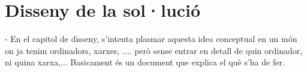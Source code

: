 \chapter{Disseny de la sol·lució}

        - En el capitol de disseny, s'intenta plasmar
        aquesta idea conceptual en un món on ja tenim
        ordinadors, xarxes, .... però sense entrar en
        detall de quin ordinador, ni quina xarxa,...
        Basicament és un document que explica el què s'ha
        de fer.
